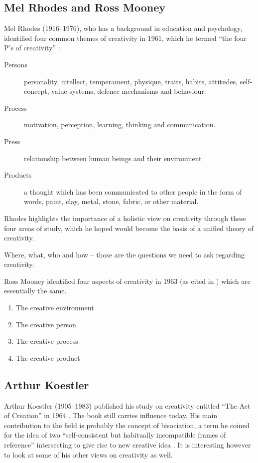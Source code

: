 \subsection{Mel Rhodes and Ross Mooney}

Mel Rhodes (1916--1976), who has a background in education and psychology, identified four common themes of creativity in 1961, which he termed ``the four P’s of creativity'' \autocite{Rhodes1961}:

\begin{description}
  \item [Persons] personality, intellect, temperament, physique, traits, habits, attitudes, self-concept, value systems, defence mechanisms and behaviour.
  \item [Process] motivation, perception, learning, thinking and communication.
  \item [Press] relationship between human beings and their environment
  \item [Products] a thought which has been communicated to other people in the form of words, paint, clay, metal, stone, fabric, or other material.
\end{description}

Rhodes highlights the importance of a holistic view on creativity through these four areas of study, which he hoped would become the basis of a unified theory of creativity.

\begin{draft}
  Where, what, who and how – those are the questions we need to ask regarding creativity.
\end{draft}

Ross Mooney identified four aspects of creativity in 1963 (as cited in \autocite{Sternberg1999}) which are essentially the same.

\begin{enumerate}
  \item The creative environment
  \item The creative person
  \item The creative process
  \item The creative product
\end{enumerate}


\subsection{Arthur Koestler}

Arthur Koestler (1905--1983) published his study on creativity entitled ``The Act of Creation'' in 1964 \autocite{Koestler1964}. The book still carries influence today. His main contribution to the field is probably the concept of \gls{bisociation}, a term he coined for the idea of two ``self-consistent but habitually incompatible frames of reference'' intersecting to give rise to new creative idea \autocite[p.35]{Koestler1964}. It is interesting however to look at some of his other views on creativity as well.

